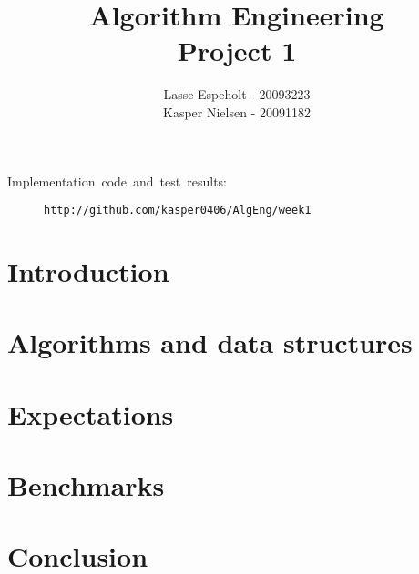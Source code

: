 \documentclass[a4paper]{article}
\begin{document}
\title{Algorithm Engineering\\Project 1}

\author{Lasse Espeholt - 20093223\\
Kasper Nielsen - 20091182}

\maketitle
\vfill{}
\begin{description}
\item [{Implementation~code~and~test~results:}] \texttt{http://github.com/kasper0406/AlgEng/week1}
\end{description}
\pagebreak{}\tableofcontents{}\pagebreak{}

\section{Introduction}


	
\section{Algorithms and data structures}



\section{Expectations}



\section{Benchmarks}



\section{Conclusion}


\end{document}
